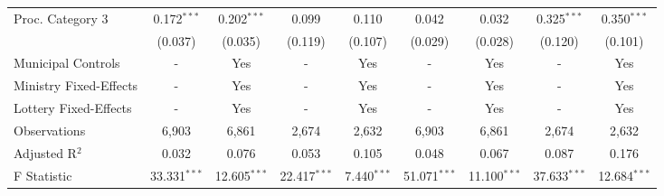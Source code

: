 \documentclass[border = 1pt$]{standalone}
\begin{document}
\begin{tabular}{l@{\extracolsep{4pt}}c@{\extracolsep{1pt}}c@{\extracolsep{3pt}}c@{\extracolsep{1pt}}c@{\extracolsep{4pt}}c@{\extracolsep{1pt}}c@{\extracolsep{3pt}}c@{\extracolsep{1pt}}c@{\extracolsep{1pt}}}
Proc. Category 3                & 0.172$^{***}$   & 0.202$^{***}$ & 0.099              & 0.110           & 0.042            & 0.032           & 0.325$^{***}$    & 0.350$^{***}$    \\
                                & (0.037)         & (0.035)       & (0.119)            & (0.107)         & (0.029)          & (0.028)         & (0.120)          & (0.101)          \\
\hline
Municipal Controls     & \multicolumn{1}{c}{-} & \multicolumn{1}{c}{Yes} & \multicolumn{1}{c}{-} & \multicolumn{1}{c}{Yes} & \multicolumn{1}{c}{-} & \multicolumn{1}{c}{Yes} & \multicolumn{1}{c}{-} & \multicolumn{1}{c}{Yes}  \\
Ministry Fixed-Effects & \multicolumn{1}{c}{-} & \multicolumn{1}{c}{Yes} & \multicolumn{1}{c}{-} & \multicolumn{1}{c}{Yes} & \multicolumn{1}{c}{-} & \multicolumn{1}{c}{Yes} & \multicolumn{1}{c}{-} & \multicolumn{1}{c}{Yes}  \\
Lottery Fixed-Effects  & \multicolumn{1}{c}{-} & \multicolumn{1}{c}{Yes} & \multicolumn{1}{c}{-} & \multicolumn{1}{c}{Yes} & \multicolumn{1}{c}{-} & \multicolumn{1}{c}{Yes} & \multicolumn{1}{c}{-} & \multicolumn{1}{c}{Yes}  \\
\hline
Observations     & \multicolumn{1}{c}{6,903}          & \multicolumn{1}{c}{6,861}          & \multicolumn{1}{c}{2,674}          & \multicolumn{1}{c}{2,632}         & \multicolumn{1}{c}{6,903}          & \multicolumn{1}{c}{6,861}          & \multicolumn{1}{c}{2,674}          & \multicolumn{1}{c}{2,632} \\
Adjusted R$^{2}$ & \multicolumn{1}{c}{0.032}          & \multicolumn{1}{c}{0.076}          & \multicolumn{1}{c}{0.053}          & \multicolumn{1}{c}{0.105}         & \multicolumn{1}{c}{0.048}          & \multicolumn{1}{c}{0.067}          & \multicolumn{1}{c}{0.087}          & \multicolumn{1}{c}{0.176} \\
F Statistic      & \multicolumn{1}{c}{33.331$^{***}$}  & \multicolumn{1}{c}{12.605$^{***}$}  & \multicolumn{1}{c}{22.417$^{***}$}  & \multicolumn{1}{c}{7.440$^{***}$}  & \multicolumn{1}{c}{51.071$^{***}$}  & \multicolumn{1}{c}{11.100$^{***}$}  & \multicolumn{1}{c}{37.633$^{***}$}  & \multicolumn{1}{c}{12.684$^{***}$} \\
\hline


\end{tabular}
\end{document}
